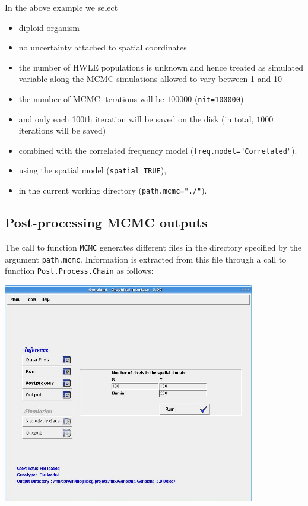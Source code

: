 \documentclass{article}
\begin{document}
\bigskip

In the above example we select

\begin{itemize}
\item diploid organism
\item no uncertainty attached to spatial coordinates
\item the number of HWLE populations is unknown and hence treated as simulated 
variable along the MCMC simulations allowed to vary between 1 and 10
\item the number of MCMC iterations will be $100000$ (\texttt{nit=100000}) 
\item and only each 100th iteration will be saved on the disk (in total, $1000$ iterations will be saved)
\item combined with 
the correlated frequency model (\texttt{freq.model="Correlated"}). 

\item using the spatial model (\texttt{spatial TRUE}), 


\item in the current working directory (\texttt{path.mcmc="./"}).
\end{itemize}


 

\clearpage
\subsection{Post-processing MCMC outputs}



The call to function \texttt{MCMC} generates different files in the directory specified by the argument \texttt{path.mcmc}. 
Information is extracted from this file through a call to function \texttt{Post.Process.Chain} as follows:\\


\centerline{\includegraphics[width=11cm]{../inst/images/postproc.jpg}}
\end{document}
